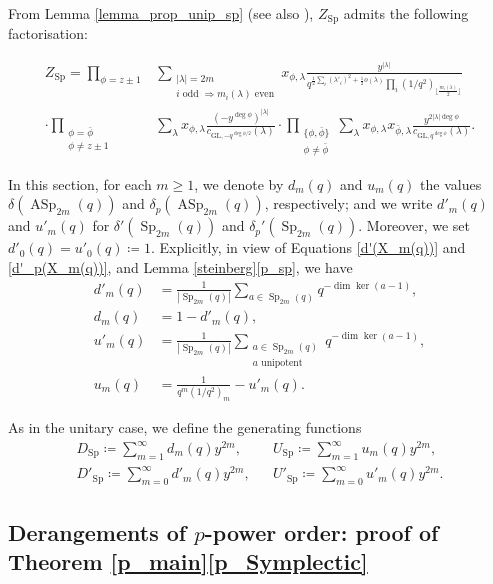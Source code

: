 \documentclass[a4paper, 12pt, oneside]{amsart}
\theoremstyle{definition}
\newcommand{\GL}{\mathrm{GL}}
\DeclareMathOperator{\ASp}{ASp}
\DeclareMathOperator{\Sp}{Sp}
\begin{document}
From Lemma \ref{lemma_prop_unip_sp} (see also \cite[Theorem 12]{Fulman_cycle_index}), $Z_{\Sp}$ admits the following factorisation:


\begin{align*}
Z_{\Sp}=\prod_{\phi=z\pm1}&\sum_{\substack{|\lambda|=2m\\ i \text{ odd }\Rightarrow m_i(\lambda) \text{ even}}}x_{\phi,\lambda}\frac{y^{|\lambda|}}{q^{\frac{1}{2}\sum_i(\lambda'_i)^2 + \frac{1}{2}o(\lambda)}\prod_i(1/q^2)_{\lfloor\frac{m_i(\lambda)}{2}\rfloor}}\\ \cdot \prod_{\substack{\phi=\bar{\phi}\\\phi \neq z\pm1}}&\sum_{\lambda}x_{\phi,\lambda}\frac{(-y^{\deg \phi})^{|\lambda|}}{c_{\GL,-q^{\deg \phi /2}}(\lambda)}
\cdot
\prod_{\substack{\{\phi,\bar{\phi}\}\\\phi \neq \bar{\phi}}}\sum_{\lambda}x_{\phi,\lambda}x_{\bar{\phi},\lambda}
\frac{y^{2|\lambda|\deg \phi}}{c_{\GL,q^{\deg \phi}}(\lambda)}.
\end{align*}


In this section, for each $m\ge1$, we denote by $d_m(q)$ and $u_m(q)$ the values $\delta(\ASp_{2m}(q))$ and $\delta_p(\ASp_{2m}(q))$, respectively; and we write $d'_m(q)$ and $u'_m(q)$ for $\delta'(\Sp_{2m}(q))$ and $\delta_p'(\Sp_{2m}(q))$. Moreover, we set $d'_0(q)=u'_0(q)\coloneqq 1$.
Explicitly, in view of Equations \eqref{d'(X_m(q))} and \eqref{d'_p(X_m(q))}, and Lemma \ref{steinberg}\eqref{p_sp}, we have
\begin{align}
d'_m(q)&=\frac{1}{|\Sp_{2m}(q)|}\sum_{a \in \Sp_{2m}(q)}q^{-\dim \ker(a-1)}, \\
d_m(q)&=1-d'_m(q), \\
 u'_m(q)&=\frac{1}{|\Sp_{2m}(q)|}\sum_{\substack{a \in \Sp_{2m}(q) \\a \text{ unipotent}}}q^{-\dim \ker(a-1)},\\
 u_m(q)&=\frac{1}{q^m(1/q^2)_m}-u'_m(q).
\end{align}

As in the unitary case, we define the generating functions
\begin{align}
D_{\Sp} \coloneqq \sum_{m=1}^{\infty}d_m(q)y^{2m}, &&
U_{\Sp} \coloneqq \sum_{m=1}^{\infty}u_m(q)y^{2m}, \\
\label{D'_Sp}
D'_{\Sp}\coloneqq\sum_{m=0}^{\infty}d'_m(q)y^{2m}, && U'_{\Sp} \coloneqq\sum_{m=0}^{\infty}u'_m(q)y^{2m}.
\end{align}
\subsection{Derangements of $p$-power order: proof of Theorem \ref{p_main}\eqref{p_Symplectic}}
\end{document}
